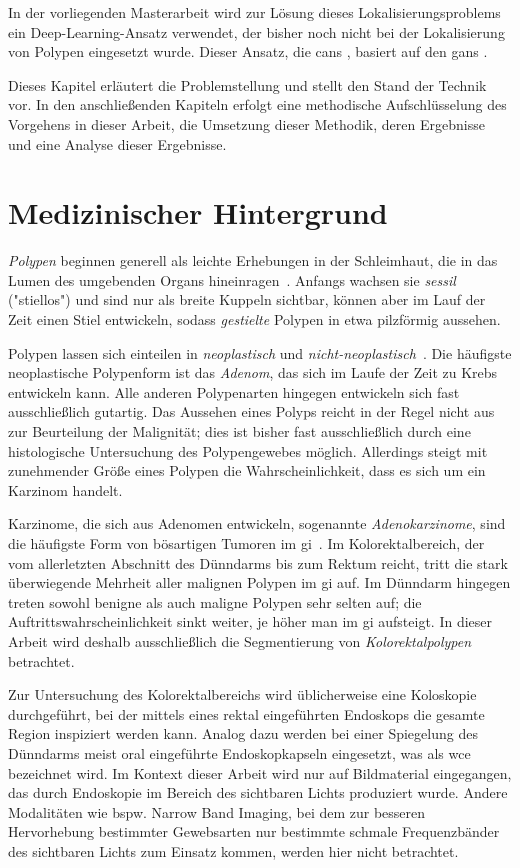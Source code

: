 In der vorliegenden Masterarbeit wird zur Lösung dieses Lokalisierungsproblems ein Deep-Learning-Ansatz verwendet, der bisher noch nicht bei der Lokalisierung von Polypen eingesetzt wurde.
Dieser Ansatz, die \glspl{can} \cite{Isola.2017}, basiert auf den \glspl{gan} \cite{Goodfellow.2014}.

Dieses Kapitel erläutert die Problemstellung und stellt den Stand der Technik vor.
In den anschließenden Kapiteln erfolgt eine methodische Aufschlüsselung des Vorgehens in dieser Arbeit, die Umsetzung dieser Methodik, deren Ergebnisse und eine Analyse dieser Ergebnisse.



\section{Medizinischer Hintergrund}

\emph{Polypen} beginnen generell als leichte Erhebungen in der Schleimhaut, die in das Lumen des umgebenden Organs hineinragen~\cite{Kumar.2005}.
Anfangs wachsen sie \emph{sessil} ("stiellos") und sind nur als breite Kuppeln sichtbar, können aber im Lauf der Zeit einen Stiel entwickeln, sodass \emph{gestielte} Polypen in etwa pilzförmig aussehen.

Polypen lassen sich einteilen in \emph{neoplastisch} und \emph{nicht-neoplastisch}~\cite{Kumar.2005}.
Die häufigste neoplastische Polypenform ist das \emph{Adenom}, das sich im Laufe der Zeit zu Krebs entwickeln kann.
Alle anderen Polypenarten hingegen entwickeln sich fast ausschließlich gutartig.
Das Aussehen eines Polyps reicht in der Regel nicht aus zur Beurteilung der Malignität; dies ist bisher fast ausschließlich durch eine histologische Untersuchung des Polypengewebes möglich.
Allerdings steigt mit zunehmender Größe eines Polypen die Wahrscheinlichkeit, dass es sich um ein Karzinom handelt.

Karzinome, die sich aus Adenomen entwickeln, sogenannte \emph{Adenokarzinome}, sind die häufigste Form von bösartigen Tumoren im \gls{gi}~\cite{Kumar.2005}.
Im Kolorektalbereich, der vom allerletzten Abschnitt des Dünndarms bis zum Rektum reicht, tritt die stark überwiegende Mehrheit aller malignen Polypen im \gls{gi} auf.
Im Dünndarm hingegen treten sowohl benigne als auch maligne Polypen sehr selten auf; die Auftrittswahrscheinlichkeit sinkt weiter, je höher man im \gls{gi} aufsteigt.
In dieser Arbeit wird deshalb ausschließlich die Segmentierung von \emph{Kolorektalpolypen} betrachtet.

Zur Untersuchung des Kolorektalbereichs wird üblicherweise eine Koloskopie durchgeführt, bei der mittels eines rektal eingeführten Endoskops die gesamte Region inspiziert werden kann.
Analog dazu werden bei einer Spiegelung des Dünndarms meist oral eingeführte Endoskopkapseln eingesetzt, was als \gls{wce} bezeichnet wird.
Im Kontext dieser Arbeit wird nur auf Bildmaterial eingegangen, das durch Endoskopie im Bereich des sichtbaren Lichts produziert wurde.
Andere Modalitäten wie bspw. Narrow Band Imaging, bei dem zur besseren Hervorhebung bestimmter Gewebsarten nur bestimmte schmale Frequenzbänder des sichtbaren Lichts zum Einsatz kommen, werden hier nicht betrachtet.



